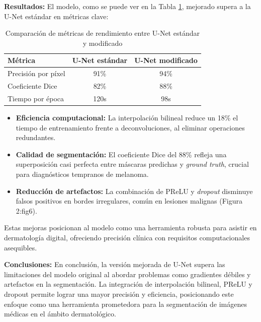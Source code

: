 \textbf{Resultados:}
El modelo, como se puede ver en la Tabla \ref{tab:unet_comparison}, mejorado supera a la U-Net estándar en métricas clave:

\begin{table}[H]
    \centering
    \caption{Comparación de métricas de rendimiento entre U-Net estándar y modificado}
    \renewcommand{\arraystretch}{1.2}
    \setlength{\tabcolsep}{10pt}
    \begin{tabular}{lcc}
        \toprule
        Métrica & U-Net estándar & U-Net modificado \\
        \midrule
        Precisión por píxel & 91\% & 94\% \\
        Coeficiente Dice & 82\% & 88\% \\
        Tiempo por época & 120s & 98s \\
        \bottomrule
    \end{tabular}
    \label{tab:unet_comparison}
\end{table}

\begin{itemize}
    \item \textbf{Eficiencia computacional:} La interpolación bilineal reduce un 18\% el tiempo de entrenamiento frente a deconvoluciones, al eliminar operaciones redundantes.


	\item \textbf{Calidad de segmentación:} El coeficiente Dice del 88\% refleja una superposición casi perfecta entre máscaras predichas y \textit{ground truth}, crucial para diagnósticos tempranos de melanoma.

	\item \textbf{Reducción de artefactos:} La combinación de PReLU y \textit{dropout} disminuye falsos positivos en bordes irregulares, común en lesiones malignas (Figura 2:fig6).

\end{itemize}

Estas mejoras posicionan al modelo como una herramienta robusta para asistir en dermatología digital, ofreciendo precisión clínica con requisitos computacionales asequibles.


\textbf{Conclusiones:}
En conclusión, la versión mejorada de U-Net supera las limitaciones del modelo original al abordar problemas como gradientes débiles y artefactos en la segmentación. La integración de interpolación bilineal, PReLU y dropout permite lograr una mayor precisión y eficiencia, posicionando este enfoque como una herramienta prometedora para la segmentación de imágenes médicas en el ámbito dermatológico.

